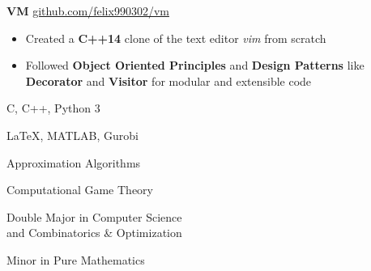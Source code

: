 \documentclass[11pt,a4paper,ragged2e]{altacv}
\begin{document}
\begin{paracol}{2}
\iffalse
\cvevent{Pleter}{}{May 2019}{\href{https://github.com/felix990302/word\_completion}{github.com/felix990302/word\_completion}}
\begin{itemize}
    \item Designed a concurrent auto-completion engine using a variation of \textbf{range trees} consisting of a \textbf{compressed trie} and sorted arrays in \textbf{C++}
    \item Accounted for race conditions and deadlocks using fine-grained read-write lock hierarchies
    \item Incorporated \textbf{gprof} as profiler for optimizations including a static \textbf{fixed-size allocator} to achieve \textbf{20x} speedup
\end{itemize}

\divider
\fi
\textbf{VM}
\hfill\href{https://github.com/felix990302/vm}{\faExternalLink* github.com/felix990302/vm}
\smallskip
\begin{itemize}
    \item Created a \textbf{C++14} clone of the text editor \emph{vim} from scratch
    \item Followed \textbf{Object Oriented Principles} and \textbf{Design Patterns} like \textbf{Decorator} and \textbf{Visitor} for modular and extensible code
\end{itemize}

\switchcolumn

C, C++, Python 3

\smallskip

\LaTeX, MATLAB, Gurobi

\divider\smallskip

Approximation Algorithms

\smallskip

Computational Game Theory

Double Major in Computer Science\\
and Combinatorics \& Optimization

\smallskip

Minor in Pure Mathematics

\smallskip


\end{paracol}
\end{document}
